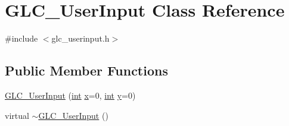 \hypertarget{class_g_l_c___user_input}{\section{G\-L\-C\-\_\-\-User\-Input Class Reference}
\label{class_g_l_c___user_input}
}


{\ttfamily \#include $<$glc\-\_\-userinput.\-h$>$}

\subsection*{Public Member Functions}
\begin{DoxyCompactItemize}
\item 
\hyperlink{class_g_l_c___user_input_a8e91aa61f19d0ef181724099a3093785}{G\-L\-C\-\_\-\-User\-Input} (\hyperlink{ioapi_8h_a787fa3cf048117ba7123753c1e74fcd6}{int} \hyperlink{glext_8h_a1db9d104e3c2128177f26aff7b46982f}{x}=0, \hyperlink{ioapi_8h_a787fa3cf048117ba7123753c1e74fcd6}{int} \hyperlink{glext_8h_a42315f3ed8fff752bb47fd782309fcfc}{y}=0)
\item 
virtual \hyperlink{class_g_l_c___user_input_ac903b06a2bdaaa8c015e7b575c869958}{$\sim$\-G\-L\-C\-\_\-\-User\-Input} ()
\end{DoxyCompactItemize}
